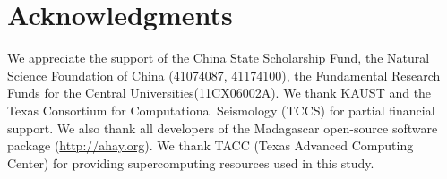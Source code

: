 \section{Acknowledgments}
We appreciate the support of the China State Scholarship Fund, the Natural Science
Foundation of China (41074087, 41174100), the Fundamental Research Funds for the Central Universities(11CX06002A). We thank KAUST and the Texas Consortium for Computational Seismology (TCCS) for partial financial support. We also thank all developers of the Madagascar open-source software package (\url{http://ahay.org}). We thank TACC (Texas Advanced Computing Center) for providing supercomputing resources used in this study. 







